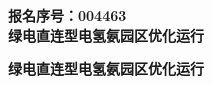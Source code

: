 \documentclass[zihao=-4,a4paper]{ctexart} %
\title{}
\author{}
\date{}
\begin{document}
	
	\thispagestyle{empty}
	\begin{center}
		
		
		\vspace{3cm}
		{ \bfseries 报名序号：004463} \\
		\vspace{3cm}
		{ \bfseries 绿电直连型电氢氨园区优化运行} \\
		\vspace{5cm}
		
	\end{center}
	\newpage
	
	\setcounter{page}{1}
	\begin{center}
		{ \bfseries 绿电直连型电氢氨园区优化运行}
	\end{center}
	\vspace{0.5cm}
	
\end{document}
